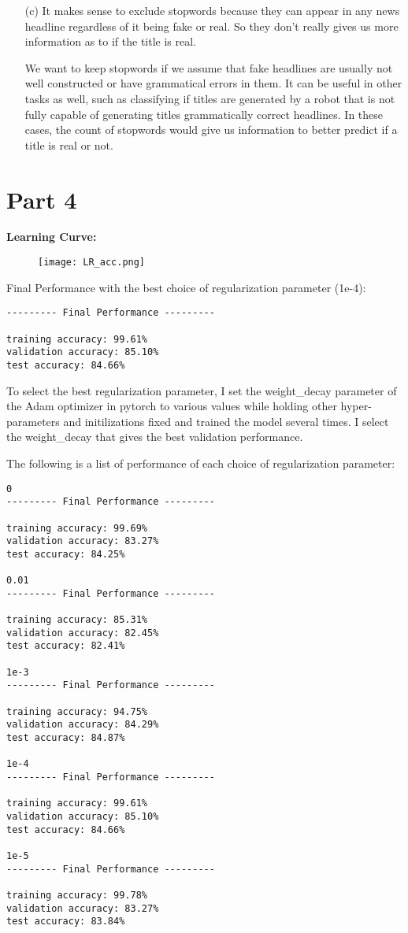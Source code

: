\documentclass{article}
\begin{document}
\begin{enumerate}
\item[(c)]
It makes sense to exclude stopwords because they can appear in any news headline regardless of it being fake or real. So they don't really gives us more information as to if the title is real.

We want to keep stopwords if we assume that fake headlines are usually not well constructed or have grammatical errors in them. It can be useful in other tasks as well, such as classifying if titles are generated by a robot that is not fully capable of generating titles grammatically correct headlines. In these cases, the count of stopwords would give us information to better predict if a title is real or not.
\end{enumerate}

\section*{Part 4}
\textbf{Learning Curve:
}

\begin{figure}[!ht]
    \centering
    \texttt{[image: LR\_acc.png]}
\end{figure}

\noindent
Final Performance with the best choice of regularization parameter (1e-4):\\
\begin{verbatim}
--------- Final Performance ---------

training accuracy: 99.61%
validation accuracy: 85.10%
test accuracy: 84.66%
\end{verbatim}

To select the best regularization parameter, I set the weight\_decay parameter of the Adam optimizer in pytorch to various values while holding other hyper-parameters and initilizations fixed and trained the model several times. I select the weight\_decay that gives the best validation performance.

The following is a list of performance of each choice of regularization parameter:

\begin{verbatim}
0
--------- Final Performance ---------

training accuracy: 99.69%
validation accuracy: 83.27%
test accuracy: 84.25%

0.01
--------- Final Performance ---------

training accuracy: 85.31%
validation accuracy: 82.45%
test accuracy: 82.41%

1e-3
--------- Final Performance ---------

training accuracy: 94.75%
validation accuracy: 84.29%
test accuracy: 84.87%

1e-4
--------- Final Performance ---------

training accuracy: 99.61%
validation accuracy: 85.10%
test accuracy: 84.66%

1e-5
--------- Final Performance ---------

training accuracy: 99.78%
validation accuracy: 83.27%
test accuracy: 83.84%
\end{verbatim}
\end{document}
